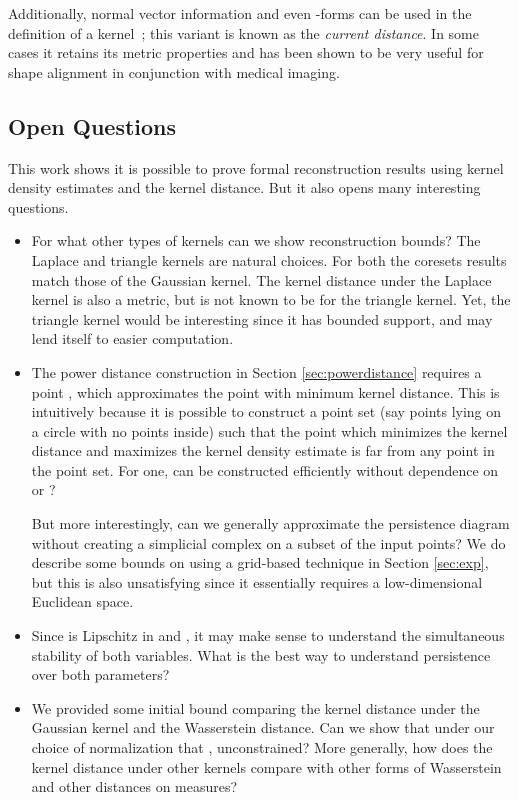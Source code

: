 \documentclass[11pt]{myclass}
\begin{document}
Additionally, normal vector information and even -forms can be used in the definition of a kernel~\cite{glaunesthesis,Vaillant2005,DurrlemanPennecTrouve2008,
DurrlemanPennecTrouve2007,GlaunesJoshi2006,JoshiKommarajuPhillips2011}; this variant is known as the \emph{current distance}.  In some cases it retains its metric properties and has been shown to be very useful for shape alignment in conjunction with medical imaging.  






\subsection{Open Questions}
\label{sec:open}
This work shows it is possible to prove formal reconstruction results using kernel density estimates and the kernel distance.  But it also opens many interesting questions.  

\begin{itemize}
\item For what other types of kernels can we show reconstruction bounds?  The Laplace and triangle kernels are natural choices.  For both the coresets results match those of the Gaussian kernel.  The kernel distance under the Laplace kernel is also a metric, but is not known to be for the triangle kernel.  Yet, the triangle kernel would be interesting since it has bounded support, and may lend itself to easier computation.  

\item The power distance construction in Section \ref{sec:powerdistance} requires a point , which approximates the point with minimum kernel distance.  This is intuitively because it is possible to construct a point set  (say points lying on a circle with no points inside) such that the point  which minimizes the kernel distance and maximizes the kernel density estimate is far from any point in the point set.  
For one, can  be constructed efficiently without dependence on  or ?  

But more interestingly, can we generally approximate the persistence diagram without creating a simplicial complex on a subset of the input points?  We do describe some bounds on using a grid-based technique in Section \ref{sec:exp}, but this is also unsatisfying since it essentially requires a low-dimensional Euclidean space.  

\item Since  is Lipschitz in  and , it may make sense to understand the simultaneous stability of both variables.  What is the best way to understand persistence over both parameters?  

\item We provided some initial bound comparing the kernel distance under the Gaussian kernel and the Wasserstein  distance.  Can we show that under our choice of normalization that , unconstrained?  More generally, how does the kernel distance under other kernels compare with other forms of Wasserstein and other distances on measures?  
\end{itemize}
\end{document}
